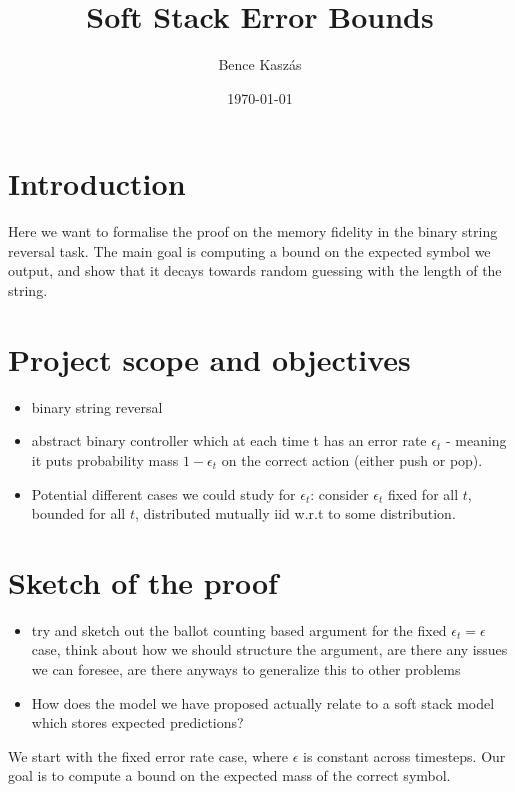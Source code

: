 \documentclass{article}
\title{Soft Stack Error Bounds}
\author{Bence Kaszás}
\date{\today}
\newcommand{\eps}{\epsilon}
\begin{document}
\maketitle

\section{Introduction}

Here we want to formalise the proof on the memory fidelity in the binary string reversal task. The main goal is computing a bound on the expected symbol we output, and show that it decays towards random guessing with the length of the string.

\section{Project scope and objectives}
\begin{itemize}
    \item binary string reversal
    \item abstract binary controller which at each time t has an error rate $\eps_t$ - meaning it puts probability mass $1 - \eps_t$ on the correct action (either push or pop).
    \item Potential different cases we could study for $\eps_t$: consider $\eps_t$ fixed for all $t$, bounded for all $t$, distributed mutually iid w.r.t to some distribution.
\end{itemize}



\section{Sketch of the proof}

\begin{itemize}
    \item try and sketch out the ballot counting based argument for the fixed $\eps_t = \eps$ case, think about how we should structure the argument, are there any issues we can foresee, are there anyways to generalize this to other problems
    \item How does the model we have proposed actually relate to a soft stack model which stores expected predictions?
\end{itemize}



We start with the fixed error rate case, where $\eps$ is constant across timesteps. Our goal is to compute a bound on the expected mass of the correct symbol.
\end{document}
